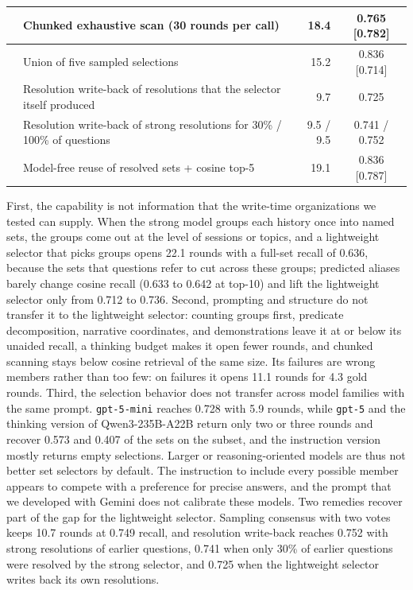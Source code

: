 \begin{table}[t]
{\begin{tabular}{llrc}
 & Chunked exhaustive scan (30 rounds per call) & 18.4 & 0.765 [0.782] \\
\midrule
{}
 & Union of five sampled selections & 15.2 & 0.836 [0.714] \\
 & Resolution write-back of resolutions that the selector itself produced & 9.7 & 0.725 \\
 & Resolution write-back of strong resolutions for 30\% / 100\% of questions & 9.5 / 9.5 & 0.741 / 0.752 \\
 & Model-free reuse of resolved sets + cosine top-5 & 19.1 & 0.836 [0.787] \\
\bottomrule
\end{tabular}}
\end{table}

First, the capability is not information that the write-time organizations we tested can supply. When the strong model groups each history once into named sets, the groups come out at the level of sessions or topics, and a lightweight selector that picks groups opens 22.1 rounds with a full-set recall of 0.636, because the sets that questions refer to cut across these groups; predicted aliases barely change cosine recall (0.633 to 0.642 at top-10) and lift the lightweight selector only from 0.712 to 0.736. Second, prompting and structure do not transfer it to the lightweight selector: counting groups first, predicate decomposition, narrative coordinates, and demonstrations leave it at or below its unaided recall, a thinking budget makes it open fewer rounds, and chunked scanning stays below cosine retrieval of the same size. Its failures are wrong members rather than too few: on failures it opens 11.1 rounds for 4.3 gold rounds. Third, the selection behavior does not transfer across model families with the same prompt. \texttt{gpt-5-mini} reaches 0.728 with 5.9 rounds, while \texttt{gpt-5} and the thinking version of Qwen3-235B-A22B return only two or three rounds and recover 0.573 and 0.407 of the sets on the subset, and the instruction version mostly returns empty selections. Larger or reasoning-oriented models are thus not better set selectors by default. The instruction to include every possible member appears to compete with a preference for precise answers, and the prompt that we developed with Gemini does not calibrate these models. Two remedies recover part of the gap for the lightweight selector. Sampling consensus with two votes keeps 10.7 rounds at 0.749 recall, and resolution write-back reaches 0.752 with strong resolutions of earlier questions, 0.741 when only 30\% of earlier questions were resolved by the strong selector, and 0.725 when the lightweight selector writes back its own resolutions.

